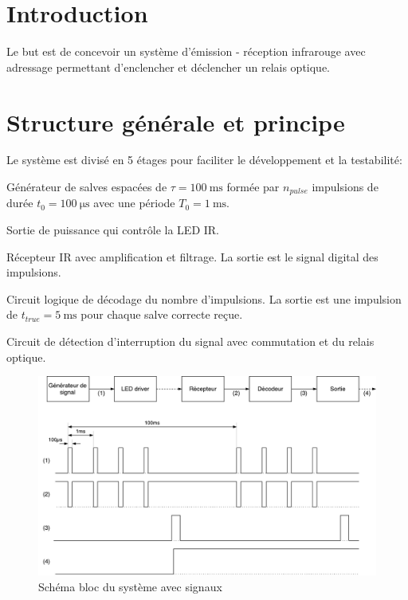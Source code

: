 \documentclass[french]{layout/Report}
\begin{document}

\pagebreak

\section{Introduction}
Le but est de concevoir un système d'émission - réception infrarouge avec adressage
permettant d'enclencher et déclencher un relais optique.

\section{Structure générale et principe}

Le système est divisé en 5 étages pour faciliter le développement et la testabilité:

\begin{description}[leftmargin=!,labelwidth=4cm, labelindent=\parindent]
	\item[Générateur de signal] Générateur de salves espacées de $\tau = \SI{100}{\milli\second}$ formée par $n_{pulse}$ impulsions de durée $t_0 =  \SI{100}{\micro\second}$ avec une période $T_0 = \SI{1}{\milli\second}$. 
\item[LED driver] Sortie de puissance qui contrôle la LED IR.
\item[Récepteur] Récepteur IR avec amplification et filtrage. La sortie est le signal digital des impulsions.
\item[Décodeur] Circuit logique de décodage du nombre d'impulsions. La sortie est une impulsion de $t_{true} = \SI{5}{\milli\second}$ pour chaque salve correcte reçue.
\item[Sortie] Circuit de détection d'interruption du signal avec commutation et du relais optique.
\end{description}

\begin{figure}[H]
\centering
\vspace{5mm}
\includegraphics[width=\textwidth]{fig/IRemote_schema_structure}
\caption{Schéma bloc du système avec signaux}
\label{fig:schema_bloc}
\vspace{5mm}
\end{figure}
\end{document}
